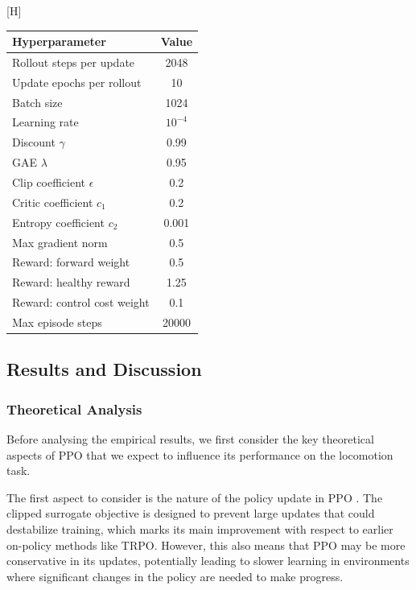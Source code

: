 \documentclass[onecolumn]{cwpreport} %
\makeatletter
\renewenvironment{table}[1][htbp]{%
  \@float{table}[#1]%
}{%
  \end@float
}
\makeatother
\begin{document}
\begin{table}[H]
    \centering
    \caption{PPO hyperparameters for Hopper-v5 with pixel observations.}
    \label{tab:ppo_hp}
    \begin{tabular}{lc}
        \toprule
        \textbf{Hyperparameter}     & \textbf{Value} \\
        \midrule
        Rollout steps per update    & 2048           \\
        Update epochs per rollout   & 10             \\
        Batch size                  & 1024           \\
        Learning rate               & $10^{-4}$      \\
        Discount $\gamma$           & 0.99           \\
        GAE $\lambda$               & 0.95           \\
        Clip coefficient $\epsilon$ & 0.2            \\
        Critic coefficient $c_1$    & 0.2            \\
        Entropy coefficient $c_2$   & 0.001          \\
        Max gradient norm           & 0.5            \\
        Reward: forward weight      & 0.5            \\
        Reward: healthy reward      & 1.25           \\
        Reward: control cost weight & 0.1            \\
        Max episode steps           & 20000          \\
        \bottomrule
    \end{tabular}
\end{table}


\subsection{Results and Discussion}

\subsubsection{Theoretical Analysis}

Before analysing the empirical results, we first consider the key theoretical aspects of PPO that we expect to influence its performance on the locomotion task.

The first aspect to consider is the nature of the policy update in PPO \cite{schulman2017proximal}. The clipped surrogate objective is designed to prevent large updates that could destabilize training, which marks its main improvement with respect to earlier on-policy methods like TRPO. However, this also means that PPO may be more conservative in its updates, potentially leading to slower learning in environments where significant changes in the policy are needed to make progress.
\end{document}
